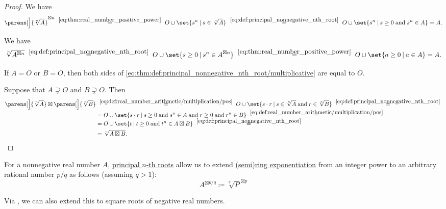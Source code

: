 \begin{proof}
   We have
  \begin{equation*}
    \parens[\Big]{ \sqrt[n]{ A } }^{\boxtimes n}
    \reloset{\eqref{eq:thm:real_number_positive_power}} =
    O \cup \set{ s^n \given s \in \sqrt[n]{ A } }
    \reloset{\eqref{eq:def:principal_nonnegative_nth_root}} =
    O \cup \set{ s^n \given s \geq 0 \T{and} s^n \in A }
    =
    A.
  \end{equation*}

   We have
  \begin{equation*}
    \sqrt[n]{ A^{\boxtimes n} }
    \reloset{\eqref{eq:def:principal_nonnegative_nth_root}} =
    O \cup \set{ s \geq 0 \given s^n \in A^{\boxtimes n} }
    \reloset{\eqref{eq:thm:real_number_positive_power}} =
    O \cup \set{ a \geq 0 \given a \in A }
    =
    A.
  \end{equation*}

   If \( A = O \) or \( B = O \), then both sides of \eqref{eq:thm:def:principal_nonnegative_nth_root/multiplicative} are equal to \( O \).

  Suppose that \( A \supsetneq O \) and \( B \supsetneq O \). Then
  \begin{align*}
    \parens[\Big]{\sqrt[n]{ A }} \boxtimes \parens[\Big]{\sqrt[n]{ B }}
    &\reloset {\eqref{eq:def:real_number_arithmetic/multiplication/pos}} =
    O \cup \set{ s \cdot r \given s \in \sqrt[n]{ A } \T{and} r \in \sqrt[n]{ B }}
    \reloset {\eqref{eq:def:principal_nonnegative_nth_root}} = \\ &=
    O \cup \set{ s \cdot r \given s \geq 0 \T{and} s^n \in A \T{and} r \geq 0 \T{and} r^n \in B }
    \reloset {\eqref{eq:def:real_number_arithmetic/multiplication/pos}} = \\ &=
    O \cup \set{ t \given t \geq 0 \T{and} t^n \in A \boxtimes B }
    \reloset {\eqref{eq:def:principal_nonnegative_nth_root}} = \\ &=
    \sqrt[n]{ A \boxtimes B }.
  \end{align*}
\end{proof}

\begin{definition}\label{def:real_number_rational_exponent}
  For a nonnegative real number \( A \), \hyperref[def:principal_nonnegative_nth_root]{principal \( n \)-th roots} allow us to extend \hyperref[def:semiring/exponentiation]{(semi)ring exponentiation} from an integer power to an arbitrary rational number \( p / q \) as follows (assuming \( q > 1 \)):
  \begin{equation}\label{eq:def:real_number_rational_exponent}
    A^{\boxtimes p / q} \coloneqq \sqrt[q]{ P }^{\boxtimes p}
  \end{equation}
\end{definition}
\begin{comments}
  \item Via , we can also extend this to square roots of negative real numbers.
\end{comments}

